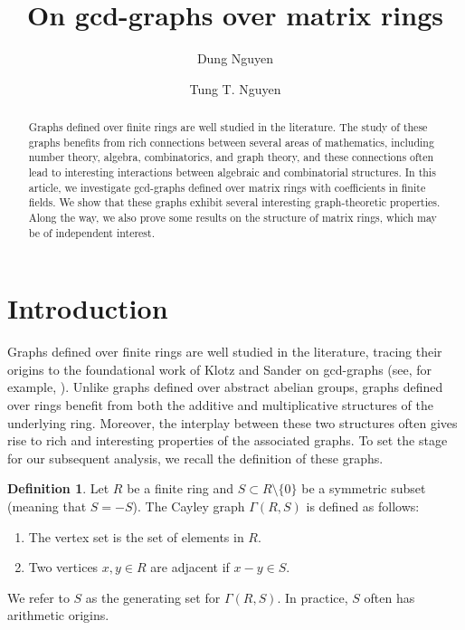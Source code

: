 \documentclass[12pt, a4paper]{amsart}
\theoremstyle{definition}
\newtheorem{definition}[thm]{Definition}
\numberwithin{equation}{section}
\begin{document}
\title{On gcd-graphs over matrix rings}

\author{Dung Nguyen}
\address{Elmhurst University, Elmhurst, IL 60126, USA.}

\author{Tung T. Nguyen}
\address{Elmhurst University, Elmhurst, IL 60126, USA.}

\begin{abstract}
Graphs defined over finite rings are well studied in the literature. The study of these graphs benefits from rich connections between several areas of mathematics, including number theory, algebra, combinatorics, and graph theory, and these connections often lead to interesting interactions between algebraic and combinatorial structures. In this article, we investigate gcd-graphs defined over matrix rings with coefficients in finite fields.  We show that these graphs exhibit several interesting graph-theoretic properties. Along the way, we also prove some results on the structure of matrix rings, which may be of independent interest.
\end{abstract}

\maketitle

\section{Introduction}
Graphs defined over finite rings are well studied in the literature, tracing their origins to the foundational work of Klotz and Sander on gcd-graphs (see, for example, \cite{unitary,anderson2021graphs, klotz2007some, nguyengcd2026}). Unlike graphs defined over abstract abelian groups, graphs defined over rings benefit from both the additive and multiplicative structures of the underlying ring. Moreover, the interplay between these two structures often gives rise to rich and interesting properties of the associated graphs. To set the stage for our subsequent analysis, we recall the definition of these graphs.
\begin{definition} \label{def:cayley}
Let $R$ be a finite ring and $S \subset R \setminus \{0\}$ be a symmetric subset (meaning that $S=-S$). The Cayley graph $\Gamma(R,S)$ is defined as follows:
\begin{enumerate}
    \item The vertex set is the set of elements in $R$.
    \item Two vertices $x, y \in R$ are adjacent if $x - y \in S$.
\end{enumerate}
We refer to $S$ as the generating set for $\Gamma(R,S)$. In practice, $S$ often has arithmetic origins. 
\end{definition}
\end{document}
